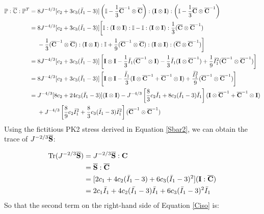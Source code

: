 \begin{equation} \label{part12}
\begin{split}
\mathbb{P} : \overline{\mathbb{C}} : {\mathbb{P}}^T 
= {}& 8J^{-4/3}[c_2 + 3c_3({\bar{I}}_1 - 3 )] \left( \mathbb{I} - \frac{1}{3}{\overline{\bold{C}}}^{-1} \otimes {\overline{\bold{C}}} \right) : (\bold{I} \otimes \bold{I}): \left(\mathbb{I} - \frac{1}{3}{\overline{\bold{C}}} \otimes {\overline{\bold{C}}}^{-1}\right) \\
= {}& 8J^{-4/3}[c_2 + 3c_3({\bar{I}}_1 - 3 )] \bigg[\mathbb{I}:(\bold{I} \otimes \bold{I}):\mathbb{I} - \mathbb{I}:(\bold{I} \otimes \bold{I}): \frac{1}{3} ({\overline{\bold{C}}} \otimes {\overline{\bold{C}}}^{-1}) \\
&- \frac{1}{3} ({\overline{\bold{C}}}^{-1} \otimes {\overline{\bold{C}}}) : (\bold{I} \otimes \bold{I}) : \mathbb{I} +  \frac{1}{9} ({\overline{\bold{C}}}^{-1} \otimes {\overline{\bold{C}}}) : (\bold{I} \otimes \bold{I}) : ({\overline{\bold{C}}} \otimes {\overline{\bold{C}}}^{-1}) \bigg] \\
= {}& 8J^{-4/3}[c_2 + 3c_3({\bar{I}}_1 - 3 )] \left[ \bold{I} \otimes \bold{I} - \frac{1}{3}\bar{I}_1({\overline{\bold{C}}}^{-1} \otimes \bold{I}) - \frac{1}{3}\bar{I}_1 (\bold{I} \otimes {\overline{\bold{C}}}^{-1}) + \frac{1}{9}{\bar{I}_1}^2({\overline{\bold{C}}}^{-1} \otimes {\overline{\bold{C}}}^{-1}) \right] \\
= {}& 8J^{-4/3} [c_2 + 3c_3({\bar{I}}_1 - 3 )] \left[ \bold{I} \otimes \bold{I} - \frac{{\bar{I}}_1}{3}(\bold{I} \otimes {\overline{\bold{C}}}^{-1} +{\overline{\bold{C}}}^{-1}  \otimes  \bold{I}) + \frac{{{\bar{I}}_1}^2}{9} ({\overline{\bold{C}}}^{-1} \otimes {\overline{\bold{C}}}^{-1}) \right] \\
= {}&  J^{-4/3}[8c_2 + 24c_3({\bar{I}}_1 - 3 )] (\bold{I} \otimes \bold{I} ) -  J^{-4/3} \left[ \frac{8}{3}c_2{\bar{I}}_1 + 8c_3({\bar{I}}_1 - 3 ){\bar{I}}_1 \right] (\bold{I} \otimes {\overline{\bold{C}}}^{-1} +{\overline{\bold{C}}}^{-1}  \otimes  \bold{I}) \\
&+
J^{-4/3} \left[ \frac{8}{9}c_2{\bar{I}_1}^2 + \frac{8}{3}c_3({\bar{I}}_1 - 3 ){\bar{I}_1}^2 \right] ({\overline{\bold{C}}}^{-1} \otimes {\overline{\bold{C}}}^{-1})
\end{split}
\end{equation}
Using the fictitious PK2 stress derived in Equation \ref{Sbar2}, we can obtain the trace of $J^{-2/3}\overline{\bold{S}}$:

\begin{equation}
\begin{split}
\mathrm{Tr}(J^{-2/3}\overline{\bold{S}}) &= J^{-2/3}\overline{\bold{S}}:\bold{C} \\
&= \overline{\bold{S}} : \overline{\bold{C}} \\
&=  [2c_1 + 4c_2(\bar{I}_1 - 3) + 6c_3(\bar{I}_1 - 3)^2] (\bold{I} : \overline{\bold{C}}) \\
&= 2c_1\bar{I}_1 + 4c_2(\bar{I_1} - 3)\bar{I}_1 + 6c_3(\bar{I}_1 - 3)^2\bar{I}_1
\end{split}
\end{equation}
So that the second term on the right-hand side of Equation \ref{Ciso} is:

